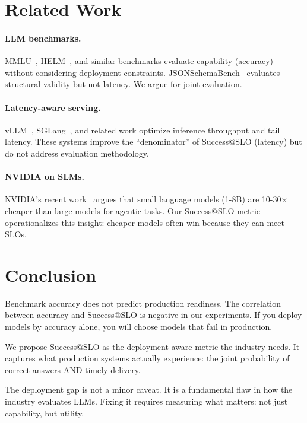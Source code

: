 \documentclass[11pt]{article}
\begin{document}
\section{Related Work}

\paragraph{LLM benchmarks.}
MMLU~\cite{hendrycks2021mmlu}, HELM~\cite{liang2022helm}, and similar benchmarks evaluate capability (accuracy) without considering deployment constraints.
JSONSchemaBench~\cite{geng2025jsonschemabench} evaluates structural validity but not latency.
We argue for joint evaluation.

\paragraph{Latency-aware serving.}
vLLM~\cite{kwon2023vllm}, SGLang~\cite{zheng2023sglang}, and related work optimize inference throughput and tail latency.
These systems improve the ``denominator'' of Success@SLO (latency) but do not address evaluation methodology.

\paragraph{NVIDIA on SLMs.}
NVIDIA's recent work~\cite{nvidia2025slm} argues that small language models (1-8B) are 10-30$\times$ cheaper than large models for agentic tasks.
Our Success@SLO metric operationalizes this insight: cheaper models often win because they can meet SLOs.

\section{Conclusion}

Benchmark accuracy does not predict production readiness.
The correlation between accuracy and Success@SLO is negative in our experiments.
If you deploy models by accuracy alone, you will choose models that fail in production.

We propose Success@SLO as the deployment-aware metric the industry needs.
It captures what production systems actually experience: the joint probability of correct answers AND timely delivery.

The deployment gap is not a minor caveat.
It is a fundamental flaw in how the industry evaluates LLMs.
Fixing it requires measuring what matters: not just capability, but utility.

\printbibliography
\end{document}
